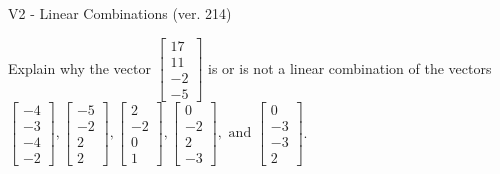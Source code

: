 \begin{exercise}
  \begin{exerciseTitle}V2 - Linear Combinations (ver. 214)\end{exerciseTitle}
  \begin{exerciseStatement}
    Explain why the vector \(\left[\begin{array}{c}
17 \\
11 \\
-2 \\
-5
\end{array}\right]\)  is or is not a linear 
	combination of the vectors \(\left[\begin{array}{c}
-4 \\
-3 \\
-4 \\
-2
\end{array}\right] , \left[\begin{array}{c}
-5 \\
-2 \\
2 \\
2
\end{array}\right] , \left[\begin{array}{c}
2 \\
-2 \\
0 \\
1
\end{array}\right] , \left[\begin{array}{c}
0 \\
-2 \\
2 \\
-3
\end{array}\right] , \text{ and } \left[\begin{array}{c}
0 \\
-3 \\
-3 \\
2
\end{array}\right]\).
	



\end{exerciseStatement}
\end{exercise}
